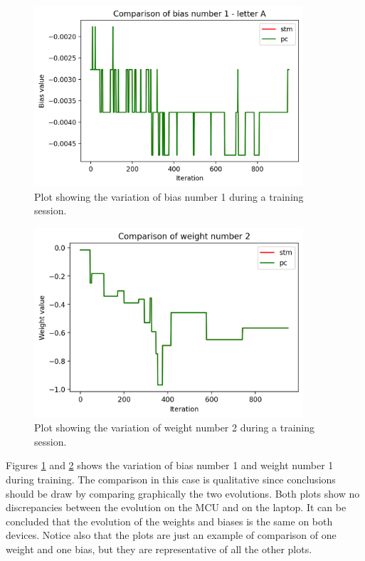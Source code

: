 \documentclass[12pt]{report}
\begin{document}
\begin{figure}[h!]
    \centering
    \includegraphics[width=100mm]{Figures/Chapter5/bias_example.png} 
    \caption{Plot showing the variation of bias number 1 during a training session.}
    \label{fig:comparison_bias}    
\end{figure}

\begin{figure}[h!]
    \centering
    \includegraphics[width=100mm]{Figures/Chapter5/weight_example.png} 
    \caption{Plot showing the variation of weight number 2 during a training session.}
    \label{fig:comparison_weights}    
\end{figure}

Figures \ref{fig:comparison_bias} and \ref{fig:comparison_weights} shows the variation of bias number 1 and weight number 1 during training. The comparison in this case is qualitative since conclusions should be draw by comparing graphically the two evolutions. Both plots show no discrepancies between the evolution on the MCU and on the laptop. It can be concluded that the evolution of the weights and biases is the same on both devices. Notice also that the plots are just an example of comparison of one weight and one bias, but they are representative of all the other plots.
\end{document}
